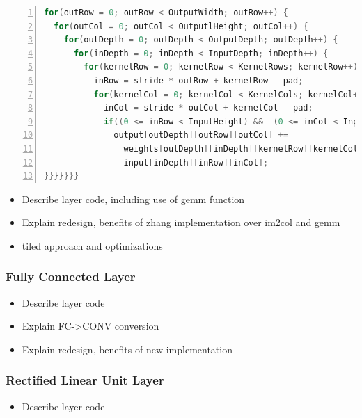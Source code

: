 \documentclass[12pt]{article}
\begin{document}
\renewcommand{\lstlistingname}{Code}
\begin{lstlisting}[frame=single, caption=Basic Convolution, label=code:conv-initial, captionpos=b, numbers=left, language=C]
for(outRow = 0; outRow < OutputWidth; outRow++) {
  for(outCol = 0; outCol < OutputlHeight; outCol++) {
    for(outDepth = 0; outDepth < OutputDepth; outDepth++) {
      for(inDepth = 0; inDepth < InputDepth; inDepth++) {
        for(kernelRow = 0; kernelRow < KernelRows; kernelRow++) {
          inRow = stride * outRow + kernelRow - pad;
          for(kernelCol = 0; kernelCol < KernelCols; kernelCol++) {
            inCol = stride * outCol + kernelCol - pad;
            if((0 <= inRow < InputHeight) &&  (0 <= inCol < InputWidth)) {
              output[outDepth][outRow][outCol] +=
                weights[outDepth][inDepth][kernelRow][kernelCol] *
                input[inDepth][inRow][inCol];
}}}}}}}
\end{lstlisting} 



\begin{itemize}
\item Describe layer code, including use of gemm function
\item Explain redesign, benefits of zhang implementation over im2col and gemm
\item tiled approach and optimizations
\end{itemize}

\subsubsection{Fully Connected Layer}
\label{sec:Imp-Layers-FC}
\vspace{-12pt}

\begin{itemize}
\item Describe layer code
\item Explain FC->CONV conversion
\item Explain redesign, benefits of new implementation
\end{itemize}

\subsubsection{Rectified Linear Unit Layer}
\label{sec:Imp-Layers-Relu}
\vspace{-12pt}

\begin{itemize}
\item Describe layer code
\end{itemize}
\end{document}
